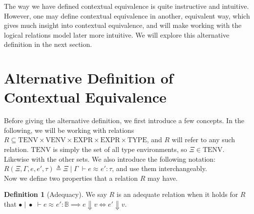 \documentclass[twoside,11pt,openright]{report}
\theoremstyle{definition}
\newtheorem{definition}{Definition}[section]
\newcommand{\expr}{e}
\newcommand{\val}{v}
\newcommand{\Tbool}{\mathbb{B}}
\newcommand{\typ}{\tau}
\newcommand{\venv}{\Gamma}
\newcommand{\tenv}{\Xi}
\newcommand{\emptenv}{\bullet}
\newcommand{\empvenv}{\bullet}
\newcommand{\VENV}{\mathrm{VENV}}
\newcommand{\TENV}{\mathrm{TENV}}
\newcommand{\EXPR}{\mathrm{EXPR}}
\newcommand{\TYPE}{\mathrm{TYPE}}
\newcommand{\jdgRel}[6]{#1 \; | \; #2 \; \vdash #3 \approx^{#4} #5 : #6}
\begin{document}
The way we have defined contextual equivalence is quite instructive and intuitive. However, one may define contextual equivalence in another, equivalent way, which gives much insight into contextual equivalence, and will make working with the logical relations model later more intuitive. We will explore this alternative definition in the next section.

\section{Alternative Definition of Contextual Equivalence}
Before giving the alternative definition, we first introduce a few concepts. In the following, we will be working with relations $R \subseteq \TENV \times \VENV \times \EXPR \times \EXPR \times \TYPE$, and $R$ will refer to any such relation. $\TENV$ is simply the set of all type environments, so $\tenv \in \TENV$. Likewise with the other sets. We also introduce the following notation: $R(\tenv, \venv, \expr, \expr', \typ) \triangleq \jdgRel{\tenv}{\venv}{\expr}{}{\expr'}{\typ}$, and use them interchangeably.\\
Now we define two properties that a relation $R$ may have.
\begin{definition}[Adequacy]
  We say $R$ is an adequate relation when it holds for $R$ that $\jdgRel{\emptenv}{\empvenv}{\expr}{}{\expr'}{\Tbool} \implies \expr \Downarrow \val \iff \expr' \Downarrow \val$.
\end{definition}
\end{document}

